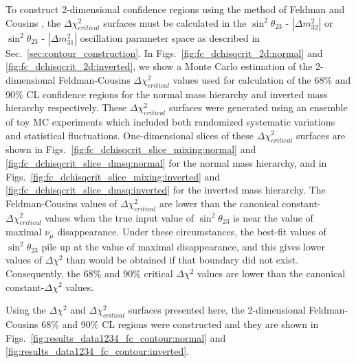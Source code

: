 To construct 2-dimensional confidence regions using the method of Feldman and Cousins \cite{FeldmanCousins},
the $\Delta\chi^{2}_{critical}$ surfaces must be calculated in the $\sin^{2}\theta_{23}$ - $|\Delta m^{2}_{32}|$
or $\sin^{2}\theta_{23}$ - $|\Delta m^{2}_{31}|$ oscillation parameter space as described in Sec.\ \ref{sec:contour_construction}.
In Figs.\ \ref{fig:fc_dchisqcrit_2d:normal} and \ref{fig:fc_dchisqcrit_2d:inverted}, we show a Monte Carlo estimation
of the 2-dimensional Feldman-Cousins $\Delta\chi^{2}_{critical}$ values
used for calculation of the 68\% and 90\% CL confidence regions for the normal mass hierarchy and inverted mass hierarchy respectively.
These $\Delta\chi^{2}_{critical}$ surfaces were generated using an ensemble of toy MC experiments which included both
randomized systematic variations and statistical fluctuations.
One-dimensional slices of these $\Delta\chi^{2}_{critical}$ surfaces
are shown in Figs.\ \ref{fig:fc_dchisqcrit_slice_mixing:normal} and \ref{fig:fc_dchisqcrit_slice_dmsq:normal} for the normal mass hierarchy,
and in Figs.\ \ref{fig:fc_dchisqcrit_slice_mixing:inverted} and \ref{fig:fc_dchisqcrit_slice_dmsq:inverted} for the inverted mass hierarchy.
The Feldman-Cousins values of $\Delta\chi^{2}_{critical}$ are lower than the canonical constant-$\Delta\chi^{2}_{critical}$ values
when the true input value of $\sin^2 \theta_{23}$ is near the value of maximal $\nu_{\mu}$ disappearance. 
Under these circumstances, the best-fit values of $\sin^2 \theta_{23}$ pile up at the value of maximal disappearance, and this gives lower
values of $\Delta\chi^{2}$ than would be obtained if that boundary did not exist. Consequently, the 68\% and 90\% critical $\Delta\chi^{2}$
values are lower than the canonical constant-$\Delta\chi^{2}$ values.

Using the $\Delta\chi^2$ and $\Delta\chi^{2}_{critical}$ surfaces presented here,
the 2-dimensional Feldman-Cousins 68\% and 90\% CL regions were constructed
and they are shown in Figs.\ \ref{fig:results_data1234_fc_contour:normal} and
\ref{fig:results_data1234_fc_contour:inverted}.

